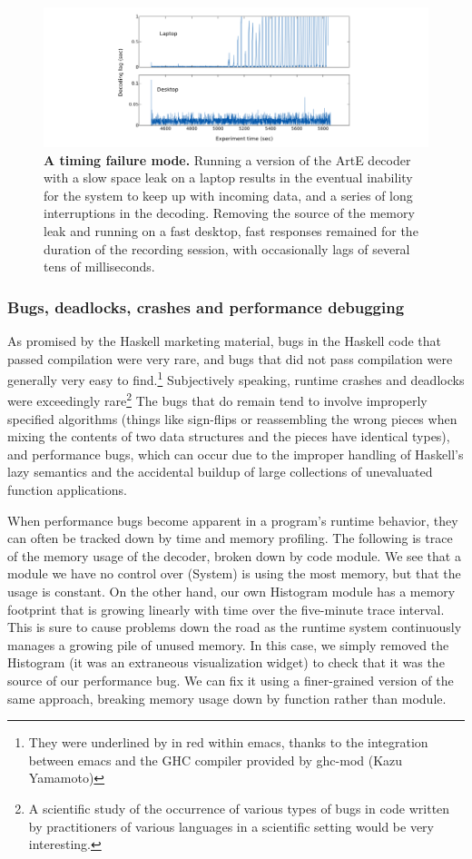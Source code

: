 \documentclass[]{article}
\begin{document}
\begin{figure}[htbp]
\centering
\includegraphics{./finalFigs/arteTiming.png}
\caption{\textbf{A timing failure mode.} Running a version of the ArtE
decoder with a slow space leak on a laptop results in the eventual
inability for the system to keep up with incoming data, and a series of
long interruptions in the decoding. Removing the source of the memory
leak and running on a fast desktop, fast responses remained for the
duration of the recording session, with occasionally lags of several
tens of milliseconds.}
\end{figure}

\subsubsection{Bugs, deadlocks, crashes and performance debugging}

As promised by the Haskell marketing material, bugs in the Haskell code
that passed compilation were very rare, and bugs that did not pass
compilation were generally very easy to find.\footnote{They were
  underlined by in red within emacs, thanks to the integration between
  emacs and the GHC compiler provided by ghc-mod (Kazu Yamamoto)}
Subjectively speaking, runtime crashes and deadlocks were exceedingly
rare\footnote{A scientific study of the occurrence of various types of
  bugs in code written by practitioners of various languages in a
  scientific setting would be very interesting.} The bugs that do remain
tend to involve improperly specified algorithms (things like sign-flips
or reassembling the wrong pieces when mixing the contents of two data
structures and the pieces have identical types), and performance bugs,
which can occur due to the improper handling of Haskell's lazy semantics
and the accidental buildup of large collections of unevaluated function
applications.

When performance bugs become apparent in a program's runtime behavior,
they can often be tracked down by time and memory profiling. The
following is trace of the memory usage of the decoder, broken down by
code module. We see that a module we have no control over (System) is
using the most memory, but that the usage is constant. On the other
hand, our own Histogram module has a memory footprint that is growing
linearly with time over the five-minute trace interval. This is sure to
cause problems down the road as the runtime system continuously manages
a growing pile of unused memory. In this case, we simply removed the
Histogram (it was an extraneous visualization widget) to check that it
was the source of our performance bug. We can fix it using a
finer-grained version of the same approach, breaking memory usage down
by function rather than module.
\end{document}
